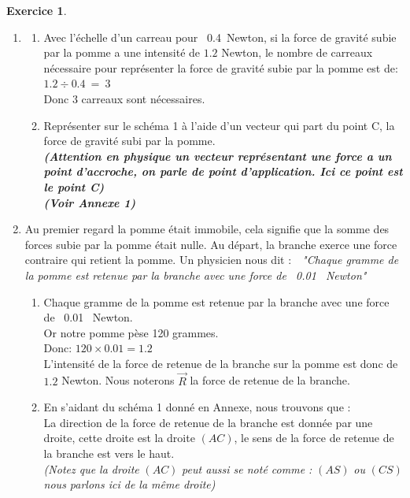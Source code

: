 \documentclass[a4paper,10.9pt]{article}
\theoremstyle{definition}
\newtheorem{exo}{Exercice}
\begin{document}
\begin{exo}
\begin{enumerate}
	\item \begin{enumerate}
		\item Avec l'échelle d'un carreau pour ~0.4~Newton, si la force de gravité subie par la pomme a une intensité de $1.2$ Newton, le nombre de carreaux nécessaire pour représenter la force de gravité subie par la pomme est de: \quad $1.2 \div 0.4 \ = \ 3$\\
		Donc $3$ carreaux sont nécessaires.\\
		\item Représenter sur le schéma 1 à l'aide d'un vecteur qui part du point C, la force de gravité subi par la pomme.\\ \textit{\textbf{(Attention en physique un vecteur représentant une force a un point d'accroche, on parle de point d'application. Ici ce point est le point C)}}\\ \textbf{\textit{(Voir Annexe 1)}}
	\end{enumerate}
	\item Au premier regard la pomme était immobile, cela signifie que la somme des forces subie par la pomme était nulle. Au départ, la branche exerce une force contraire qui retient la pomme. Un physicien nous dit :~~\textit{"Chaque gramme de la pomme est retenue par la branche avec une force de ~0.01~ Newton"} \\
	\begin{enumerate}
		\item Chaque gramme de la pomme est retenue par la branche avec une force de ~0.01~ Newton.\\
		Or notre pomme pèse 120 grammes.\\
		Donc: \quad $120 \times 0.01 = 1.2$\\
		L'intensité de la force de retenue de la branche sur la pomme est donc de $1.2$ Newton. Nous noterons $\vec{R}$ la force de retenue de la branche.\\
		\item En s'aidant du schéma 1 donné en Annexe, nous trouvons que :\\
		La direction de la force de retenue de la branche est donnée par une droite, cette droite est la droite $\left(AC\right)$, le sens de la force de retenue de la branche est vers le haut.\\ \textit{(Notez que la droite } $\left(AC\right)$ \textit{peut aussi se noté comme : } $\left(AS\right)$ \textit{ou} $\left(CS\right)$ \textit{nous parlons ici de la même droite)} \\
	\end{enumerate}

\end{enumerate}
\end{exo}
\end{document}
